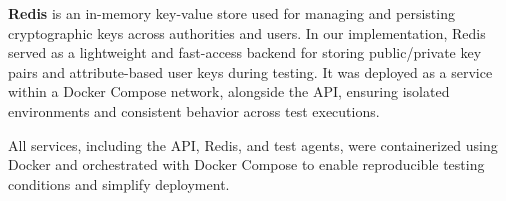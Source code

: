 \documentclass[cic,tc,english]{iiufrgs}
\begin{document}
                \textbf{Redis} is an in-memory key-value store used for managing and persisting cryptographic keys across authorities and users. In our implementation, Redis served as a lightweight and fast-access backend for storing public/private key pairs and attribute-based user keys during testing. It was deployed as a service within a Docker Compose network, alongside the API, ensuring isolated environments and consistent behavior across test executions.

                All services, including the API, Redis, and test agents, were containerized using Docker and orchestrated with Docker Compose to enable reproducible testing conditions and simplify deployment.



            

\end{document}
